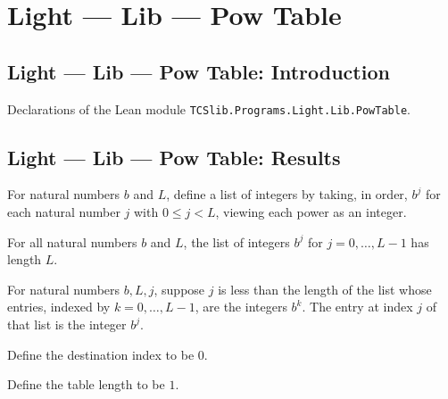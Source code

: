 \section{Light --- Lib --- Pow Table}
\subsection*{Light --- Lib --- Pow Table: Introduction}

Declarations of the Lean module \texttt{TCSlib.Programs.Light.Lib.PowTable}.

\subsection*{Light --- Lib --- Pow Table: Results}

\begin{definition}
\label{Light.powList}
\leanok
For natural numbers $b$ and $L$, define a list of integers by taking, in order, $b^j$
for each natural number $j$ with $0\le j<L$, viewing each power as an integer.
\end{definition}

\begin{theorem}
\label{Light.length_powList}
\leanok
{}
For all natural numbers $b$ and $L$, the list of integers $b^j$ for $j=0,\ldots,L-1$ has
length $L$.
\end{theorem}

\begin{theorem}
\label{Light.getElem_powList}
\leanok
{}
For natural numbers $b,L,j$, suppose $j$ is less than the length of the list whose
entries, indexed by $k=0,\ldots,L-1$, are the integers $b^k$. The entry at index $j$ of
that list is the integer $b^j$.
\end{theorem}

\begin{definition}
\label{Light.PowTable.Dest}
\leanok
Define the destination index to be $0$.
\end{definition}

\begin{definition}
\label{Light.PowTable.Len}
\leanok
{}
Define the table length to be $1$.
\end{definition}

